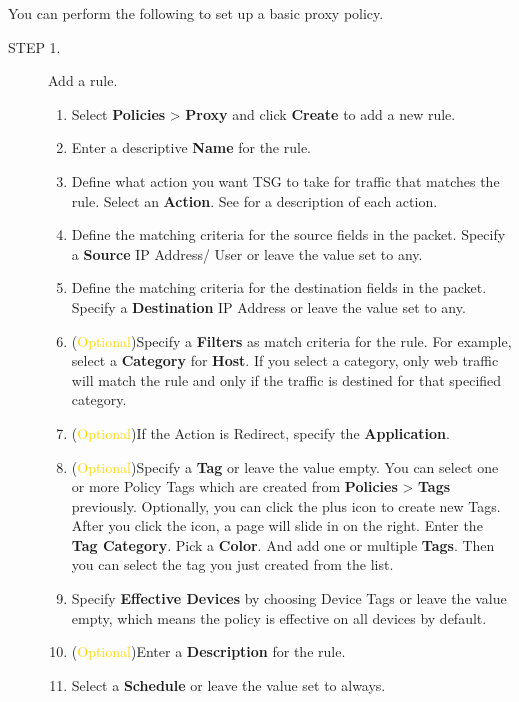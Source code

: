 You can perform the following to set up a basic proxy policy. \\
\begin{description}
    \item[STEP 1.] Add a rule. 
    \begin{enumerate} 
        \item Select \textbf{Policies} > \textbf{Proxy} and click \textbf{Create} to add a new rule.
        \item Enter a descriptive \textbf{Name} for the rule.
        \item Define what action you want TSG to take for traffic that matches the rule. Select an \textbf{Action}. See \hyperlink{link:Proxy Actions}{\color{linkblue}{Proxy Policy Actions}} for a description of each action.
        \item Define the matching criteria for the source fields in the packet. Specify a \textbf{Source} IP Address/ User or leave the value set to any.
        \item Define the matching criteria for the destination fields in the packet. Specify a \textbf{Destination} IP Address or leave the value set to any.
        \item (\textcolor{gold}{Optional})Specify a \textbf{Filters} as match criteria for the rule. For example, select a \textbf{Category} for \textbf{Host}. If you select a category, only web traffic will match the rule and only if the traffic is destined for that specified category.
        \item (\textcolor{gold}{Optional})If the Action is Redirect, specify the \textbf{Application}.
        \item (\textcolor{gold}{Optional})Specify a \textbf{Tag} or leave the value empty. 
        You can select one or more Policy Tags which are created from \textbf{Policies} > \textbf{Tags} previously. Optionally, you can click the plus icon to create new Tags. 
        After you click the icon, a page will slide in on the right. Enter the \textbf{Tag Category}. Pick a \textbf{Color}. 
        And add one or multiple \textbf{Tags}. Then you can select the tag you just created from the list.
        \item Specify \textbf{Effective Devices} by choosing Device Tags or leave the value empty, which means the policy is effective on all devices by default. 
        \item (\textcolor{gold}{Optional})Enter a \textbf{Description} for the rule.
        \item Select a \textbf{Schedule} or leave the value set to always.

\end{enumerate}
\end{description}
